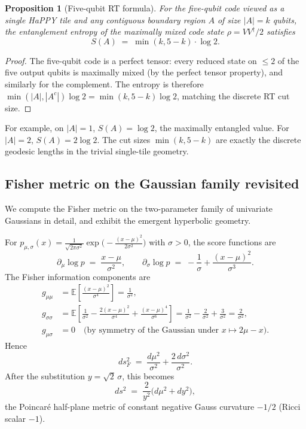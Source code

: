 \documentclass[12pt]{article}
\newtheorem{proposition}[theorem]{Proposition}
\theoremstyle{definition}
\theoremstyle{remark}
\begin{document}
\begin{proposition}[Five-qubit RT formula]
\label{prop:5qubit-rt}
For the five-qubit code viewed as a single HaPPY tile and any contiguous boundary region $A$ of size $|A| = k$ qubits, the entanglement entropy of the maximally mixed code state $\rho = V V^\dagger / 2$ satisfies
\[
S(A) \;=\; \min(k, 5-k) \cdot \log 2.
\]
\end{proposition}

\begin{proof}
The five-qubit code is a perfect tensor: every reduced state on $\leq 2$ of the five output qubits is maximally mixed (by the perfect tensor property), and similarly for the complement. The entropy is therefore $\min(|A|, |A^c|)\log 2 = \min(k, 5-k)\log 2$, matching the discrete RT cut size.
\end{proof}

For example, on $|A| = 1$, $S(A) = \log 2$, the maximally entangled value. For $|A|=2$, $S(A) = 2\log 2$. The cut sizes $\min(k,5-k)$ are exactly the discrete geodesic lengths in the trivial single-tile geometry.

\subsection{Fisher metric on the Gaussian family revisited}

We compute the Fisher metric on the two-parameter family of univariate Gaussians in detail, and exhibit the emergent hyperbolic geometry.

For $p_{\mu,\sigma}(x) = \frac{1}{\sqrt{2\pi\sigma^2}}\exp\bigl(-\frac{(x-\mu)^2}{2\sigma^2}\bigr)$ with $\sigma > 0$, the score functions are
\[
\partial_\mu \log p \;=\; \frac{x-\mu}{\sigma^2}, \qquad \partial_\sigma \log p \;=\; -\frac{1}{\sigma} + \frac{(x-\mu)^2}{\sigma^3}.
\]
The Fisher information components are
\begin{align*}
g_{\mu\mu} &= \mathbb{E}\!\left[\frac{(x-\mu)^2}{\sigma^4}\right] = \frac{1}{\sigma^2},\\
g_{\sigma\sigma} &= \mathbb{E}\!\left[\frac{1}{\sigma^2} - \frac{2(x-\mu)^2}{\sigma^4} + \frac{(x-\mu)^4}{\sigma^6}\right] = \frac{1}{\sigma^2} - \frac{2}{\sigma^2} + \frac{3}{\sigma^2} = \frac{2}{\sigma^2},\\
g_{\mu\sigma} &= 0 \quad \text{(by symmetry of the Gaussian under $x \mapsto 2\mu - x$).}
\end{align*}
Hence
\[
ds^2_F \;=\; \frac{d\mu^2}{\sigma^2} + \frac{2\, d\sigma^2}{\sigma^2}.
\]
After the substitution $y = \sqrt{2}\,\sigma$, this becomes
\[
ds^2 \;=\; \frac{2}{y^2}\bigl(d\mu^2 + dy^2\bigr),
\]
the Poincar\'e half-plane metric of constant negative Gauss curvature $-1/2$ (Ricci scalar $-1$).
\end{document}
